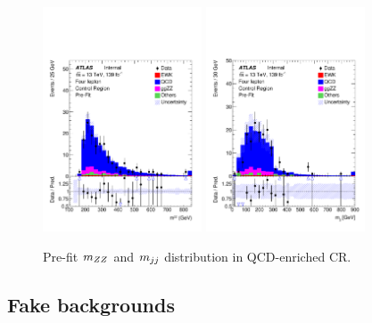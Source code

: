 \begin{figure}[!htb]
  \centering
  \includegraphics[width=0.42\textwidth]{figures/VBSZZ/QCDCR/MZZ_4l_QCD_CR.pdf}
  \includegraphics[width=0.42\textwidth]{figures/VBSZZ/QCDCR/MJJ_4l_QCD_CR_fullSyst.pdf}
  \caption{Pre-fit $m_{ZZ}$ and $m_{jj}$ distribution in QCD-enriched CR.}
  \label{fig:qcdcr_prefit}
\end{figure}

\subsection{Fake backgrounds}

